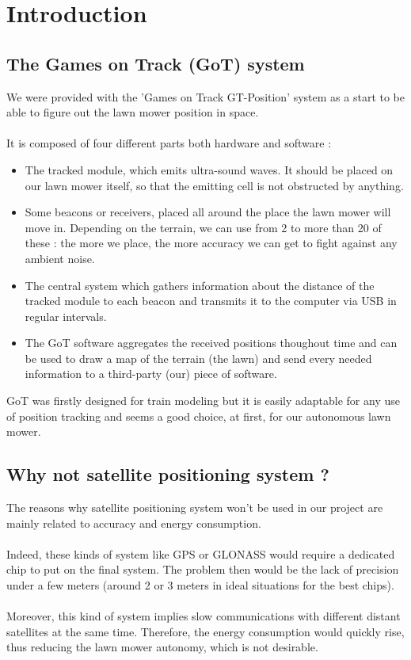 \chapter{Introduction}


\section{The Games on Track (GoT) system}
We were provided with the 'Games on Track GT-Position' system as a start to be able to figure out the lawn mower position in space.\\\\
It is composed of four different parts both hardware and software :
\begin{itemize}
	\item The tracked module, which emits ultra-sound waves. It should be placed on our lawn mower itself, so that the emitting cell is not obstructed by anything.
	\item Some beacons or receivers, placed all around the place the lawn mower will move in. Depending on the terrain, we can use from 2 to more than 20 of these : the more we place, the more accuracy we can get to fight against any ambient noise.
	\item The central system which gathers information about the distance of the tracked module to each beacon and transmits it to the computer via USB in regular intervals.
	\item The GoT software aggregates the received positions thoughout time and can be used to draw a map of the terrain (the lawn) and send every needed information to a third-party (our) piece of software.
\end{itemize}
GoT was firstly designed for train modeling but it is easily adaptable for any use of position tracking and seems a good choice, at first, for our autonomous lawn mower.

\section{Why not satellite positioning system ?}
The reasons why satellite positioning system won't be used in our project are mainly related to accuracy and energy consumption.\\\\
Indeed, these kinds of system like GPS or GLONASS would require a dedicated chip to put on the final system. The problem then would be the lack of precision under a few meters (around 2 or 3 meters in ideal situations for the best chips). \\\\
Moreover, this kind of system implies slow communications with different distant satellites at the same time. Therefore, the energy consumption would quickly rise, thus reducing the lawn mower autonomy, which is not desirable.

